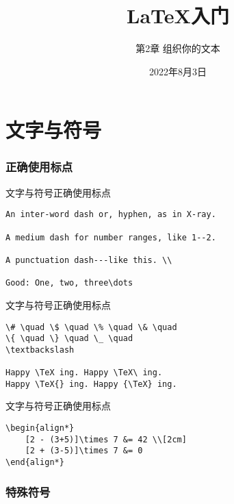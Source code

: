 \documentclass[11pt]{beamer}
\begin{document}
	\title{\LaTeX 入门}
	\subtitle{第2章 组织你的文本}
	\date{2022年8月3日}
	\begin{frame}[plain]
		\maketitle
	\end{frame}

\part{文字与符号}

\section{正确使用标点}
	
\begin{frame}[fragile]{文字与符号}{正确使用标点}
\begin{Verbatim}[tabsize=2]
An inter-word dash or, hyphen, as in X-ray.

A medium dash for number ranges, like 1--2.

A punctuation dash---like this. \\

Good: One, two, three\dots
\end{Verbatim}
\end{frame}

\begin{frame}[fragile]{文字与符号}{正确使用标点}
\begin{Verbatim}[tabsize=2]
\# \quad \$ \quad \% \quad \& \quad
\{ \quad \} \quad \_ \quad
\textbackslash

Happy \TeX ing. Happy \TeX\ ing.
Happy \TeX{} ing. Happy {\TeX} ing.
\end{Verbatim}
\end{frame}

\begin{frame}[fragile]{文字与符号}{正确使用标点}
\begin{Verbatim}[tabsize=2]
\begin{align*}
	[2 - (3+5)]\times 7 &= 42 \\[2cm]
	[2 + (3-5)]\times 7 &= 0
\end{align*}
\end{Verbatim}
\end{frame}

\section{特殊符号}
\end{document}
